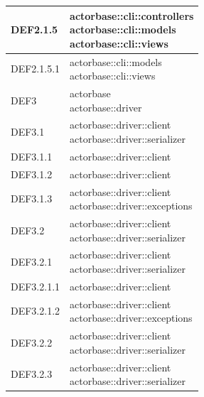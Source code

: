 \documentclass{scalatekids-article}
\begin{document}
\begin{longtable}[H]{|p{3.5cm}|p{7.5cm}|}
\hline
DEF2.1.5 & \multiLineCell[t]{actorbase::cli::controllers\\actorbase::cli::models\\actorbase::cli::views\\}\\
\hline
DEF2.1.5.1 & \multiLineCell[t]{actorbase::cli::models\\actorbase::cli::views\\}\\
\hline
DEF3 & \multiLineCell[t]{actorbase\\actorbase::driver\\}\\
\hline
DEF3.1 & \multiLineCell[t]{actorbase::driver::client\\actorbase::driver::serializer\\}\\
\hline
DEF3.1.1 & \multiLineCell[t]{actorbase::driver::client\\}\\
\hline
DEF3.1.2 & \multiLineCell[t]{actorbase::driver::client\\}\\
\hline
DEF3.1.3 & \multiLineCell[t]{actorbase::driver::client\\actorbase::driver::exceptions\\}\\
\hline
DEF3.2 & \multiLineCell[t]{actorbase::driver::client\\actorbase::driver::serializer\\}\\
\hline
DEF3.2.1 & \multiLineCell[t]{actorbase::driver::client\\actorbase::driver::serializer\\}\\
\hline
DEF3.2.1.1 & \multiLineCell[t]{actorbase::driver::client\\}\\
\hline
DEF3.2.1.2 & \multiLineCell[t]{actorbase::driver::client\\actorbase::driver::exceptions\\}\\
\hline
DEF3.2.2 & \multiLineCell[t]{actorbase::driver::client\\actorbase::driver::serializer\\}\\
\hline
DEF3.2.3 & \multiLineCell[t]{actorbase::driver::client\\actorbase::driver::serializer\\}\\

\end{longtable}
\end{document}
